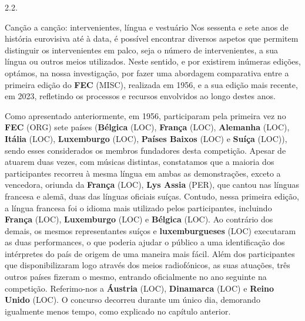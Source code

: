 \documentclass[12pt,a4paper]{article}
\begin{document}
2.2.

Canção a canção: intervenientes, língua e vestuário Nos  sessenta  e  sete  anos  de  história  eurovisiva  até  à  data,  é  possível  encontrar diversos aspetos que permitem distinguir os intervenientes em palco, seja o número de intervenientes,  a  sua  língua  ou  outros  meios  utilizados.  Neste  sentido,  e  por  existirem inúmeras edições, optámos, na nossa investigação, por fazer uma abordagem comparativa entre a primeira edição do \textbf{FEC} (MISC), realizada em 1956, e a sua edição mais recente, em 2023, refletindo os processos e recursos envolvidos ao longo destes anos.

Como  apresentado  anteriormente,  em  1956,  participaram  pela  primeira  vez  no \textbf{FEC} (ORG) sete países (\textbf{Bélgica} (LOC), \textbf{França} (LOC), \textbf{Alemanha} (LOC), \textbf{Itália} (LOC), \textbf{Luxemburgo} (LOC), \textbf{Países Baixos} (LOC) e \textbf{Suíça} (LOC)), sendo esses considerados os membros fundadores desta competição. Apesar de atuarem duas vezes, com músicas distintas, constatamos que a maioria dos participantes recorreu à mesma língua em ambas as demonstrações, exceto a vencedora, oriunda da \textbf{França} (LOC), \textbf{Lys Assia} (PER), que cantou nas línguas francesa e alemã, duas das línguas oficiais suíças. Contudo, nessa primeira edição, a língua francesa foi o idioma mais utilizado pelos participantes, incluindo  \textbf{França} (LOC),  \textbf{Luxemburgo} (LOC)  e  \textbf{Bélgica} (LOC).  Ao  contrário  dos  demais,  os  mesmos representantes suíços e \textbf{luxemburgueses} (LOC) executaram as duas performances, o que poderia ajudar o público a uma identificação dos intérpretes do país de origem de uma maneira mais  fácil.  Além  dos  participantes  que  disponibilizaram  logo  através  dos  meios radiofónicos, as suas atuações, três outros países fizeram o mesmo, entrando oficialmente no ano seguinte na competição. Referimo-nos a  \textbf{Áustria} (LOC), \textbf{Dinamarca} (LOC) e \textbf{Reino  Unido} (LOC). O concurso  decorreu  durante  um  único  dia,  demorando  igualmente  menos  tempo,  como explicado no capítulo anterior.
\end{document}
